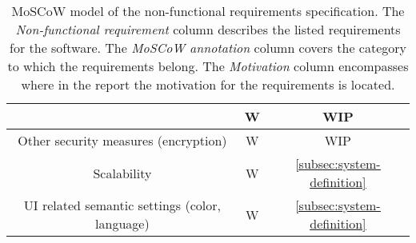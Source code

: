 \begin{table}[H]
{\begin{tabular}{ccc}
            & W
            & {WIP}
            \\ \midrule
            Other security measures (encryption)
            & W
            & {WIP}
            \\ \midrule
            Scalability
            & W
            & {\ul{\ref{subsec:system-definition}}}
            \\ \midrule
            UI related semantic settings (color, language)
            & W
            & {\ul{\ref{subsec:system-definition}}}
            \\ \bottomrule
        \end{tabular}%
    }
    \caption{MoSCoW model of the non-functional requirements specification.
    The \textit{Non-functional requirement} column describes the listed requirements for the software.
    The \textit{MoSCoW annotation} column covers the category to which the requirements belong.
    The \textit{Motivation} column encompasses where in the report the motivation for the requirements is located.
    }\label{tab:non-functional-requirements-specification}
\end{table}
